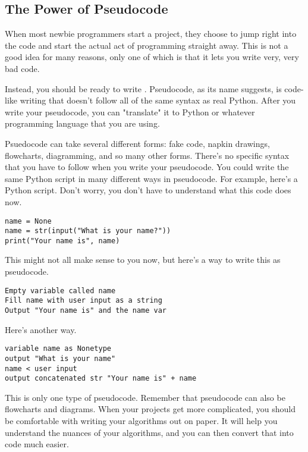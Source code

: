 \subsection{The Power of Pseudocode}
When most newbie programmers start a project, they choose to jump right into the code and start the actual act of programming straight away. This is not a good idea for many reasons, only one of which is that it lets you write very, very bad code.\par
Instead, you should be ready to write . Pseudocode, as its name suggests, is code-like writing that doesn't follow all of the same syntax as real Python. After you write your pseudocode, you can "translate" it to Python or whatever programming language that you are using.\par
Psuedocode can take several different forms: fake code, napkin drawings, flowcharts, diagramming, and so many other forms. There's no specific syntax that you have to follow when you write your pseudocode. You could write the same Python script in many different ways in pseudocode. For example, here's a Python script. Don't worry, you don't have to understand what this code does now.
\begin{lstlisting}[style=pippython]
name = None
name = str(input("What is your name?"))
print("Your name is", name)
\end{lstlisting}
This might not all make sense to you now, but here's a way to write this as pseudocode.
\begin{lstlisting}[style=none]
Empty variable called name
Fill name with user input as a string
Output "Your name is" and the name var
\end{lstlisting}
Here's another way.
\begin{lstlisting}[style=none]
variable name as Nonetype
output "What is your name"
name < user input
output concatenated str "Your name is" + name
\end{lstlisting}
This is only one type of pseudocode. Remember that pseudocode can also be flowcharts and diagrams. When your projects get more complicated, you should be comfortable with writing your algorithms out on paper. It will help you understand the nuances of your algorithms, and you can then convert that into code much easier.\par
